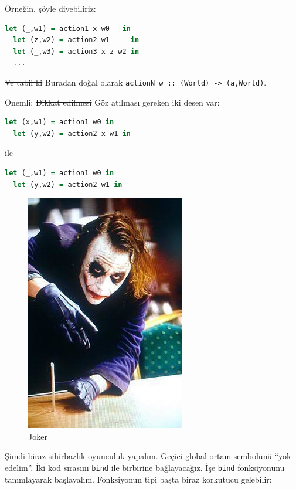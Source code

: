 \documentclass[a4paper,14pt,openany]{extbook} %
\begin{document}
Örneğin, şöyle diyebiliriz:

\begin{lstlisting}[language=Haskell]
  let (_,w1) = action1 x w0   in
  let (z,w2) = action2 w1     in
  let (_,w3) = action3 x z w2 in
  ...
\end{lstlisting}

\st{Ve tabii ki} Buradan doğal olarak \lstinline!actionN w :: (World) -> (a,World)!.

Önemli: \st{Dikkat edilmesi} Göz atılması gereken iki desen var:

\begin{lstlisting}[language=Haskell]
  let (x,w1) = action1 w0 in
  let (y,w2) = action2 x w1 in
\end{lstlisting}

  ile

\begin{lstlisting}[language=Haskell]
  let (_,w1) = action1 w0 in
  let (y,w2) = action2 w1 in
\end{lstlisting}

\begin{figure}[htbp]
  \centering
  \includegraphics{img/jocker_pencil_trick.jpg}
  \caption{Joker}
\end{figure}

Şimdi biraz \st{sihirbazlık} oyunculuk yapalım. Geçici global ortam sembolünü ``yok edelim''.
İki kod sırasını \lstinline!bind! ile birbirine bağlayacağız. İşe
\lstinline!bind! fonksiyonunu tanımlayarak başlayalım. Fonksiyonun tipi
başta biraz korkutucu gelebilir:
\end{document}
